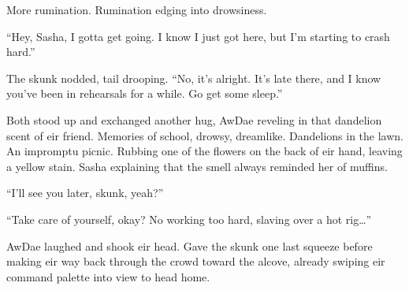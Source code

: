 More rumination. Rumination edging into drowsiness.

``Hey, Sasha, I gotta get going. I know I just got here, but I'm starting to crash hard.''

The skunk nodded, tail drooping. ``No, it's alright. It's late there, and I know you've been in rehearsals for a while. Go get some sleep.''

Both stood up and exchanged another hug, AwDae reveling in that dandelion scent of eir friend. Memories of school, drowsy, dreamlike. Dandelions in the lawn. An impromptu picnic. Rubbing one of the flowers on the back of eir hand, leaving a yellow stain. Sasha explaining that the smell always reminded her of muffins.

``I'll see you later, skunk, yeah?''

``Take care of yourself, okay? No working too hard, slaving over a hot rig\ldots{}''

AwDae laughed and shook eir head. Gave the skunk one last squeeze before making eir way back through the crowd toward the alcove, already swiping eir command palette into view to head home.
